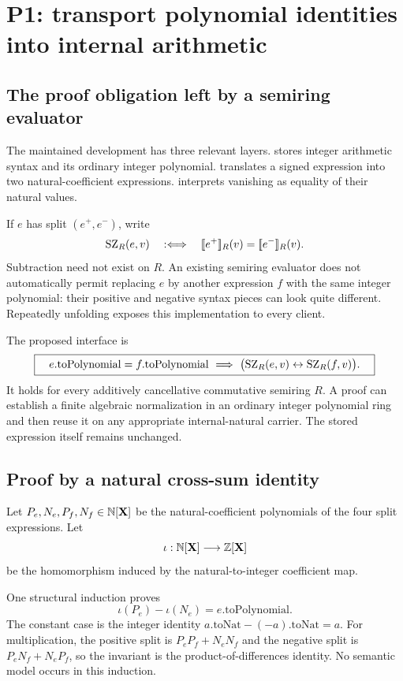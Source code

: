 \section{P1: transport polynomial identities into internal arithmetic}

\subsection{The proof obligation left by a semiring evaluator}

The maintained development has three relevant layers.
 stores integer arithmetic syntax and its
ordinary integer polynomial.
 translates a signed expression
into two natural-coefficient expressions.
 interprets vanishing as equality of
their natural values.

If $e$ has split $(e^+,e^-)$, write
\[
 \operatorname{SZ}_R(e,v)\quad:\Longleftrightarrow\quad
 [\![ e^+]\!]_R(v)=[\![ e^-]\!]_R(v).
\]
Subtraction need not exist on $R$. An existing semiring evaluator does not
automatically permit replacing $e$ by another expression $f$ with the same
integer polynomial: their positive and negative syntax pieces can look quite
different. Repeatedly unfolding  exposes this implementation
to every client.

The proposed interface is
\[
 \boxed{\quad e.\mathrm{toPolynomial}=f.\mathrm{toPolynomial}
 \ \Longrightarrow\
 \bigl(\operatorname{SZ}_R(e,v)\leftrightarrow\operatorname{SZ}_R(f,v)\bigr).\quad}
\]
It holds for every additively cancellative commutative semiring $R$.
A proof can establish a finite algebraic normalization in an ordinary integer
polynomial ring and then reuse it on any appropriate internal-natural carrier.
The stored expression itself remains unchanged.

\subsection{Proof by a natural cross-sum identity}

Let $P_e,N_e,P_f,N_f\in\mathbb N[\mathbf X]$ be the natural-coefficient polynomials
of the four split expressions. Let
\[
 \iota:\mathbb N[\mathbf X]\longrightarrow\mathbb Z[\mathbf X]
\]
be the homomorphism induced by the natural-to-integer coefficient map.

One structural induction proves
\[
 \iota(P_e)-\iota(N_e)=e.\mathrm{toPolynomial}.
 \tag{1}
\]
The constant case is the integer identity
$a.\mathrm{toNat}-(-a).\mathrm{toNat}=a$.
For multiplication, the positive split is $P_eP_f+N_eN_f$ and the negative
split is $P_eN_f+N_eP_f$, so the invariant is the product-of-differences
identity. No semantic model occurs in this induction.

